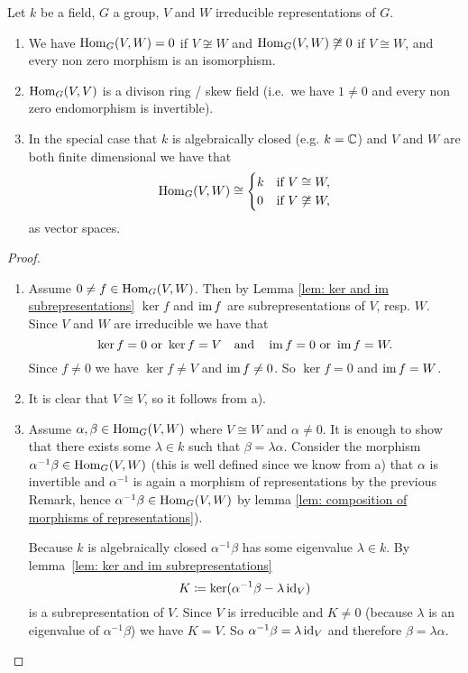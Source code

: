 \begin{lem}
 Let $k$ be a field, $G$ a group, $V$ and $W$ irreducible representations of $G$.
 \begin{enumerate}[label=\emph{\alph*})]
  \item
  We have $\operatorname{Hom}_G(V,W) = 0$ if $V \not\cong W$ and $\operatorname{Hom}_G(V,W) \not\cong 0$ if $V \cong W$, and every non zero morphism is an isomorphism.
  \item
  $\operatorname{Hom}_G(V,V)$ is a divison ring / skew field (i.e.\ we have $1 \neq 0$ and every non zero endomorphism is invertible).
  \item
  In the special case that $k$ is algebraically closed (e.g. $k = \mathbb{C}$) and $V$ and $W$ are both finite dimensional we have that
  \[
   \operatorname{Hom}_G(V,W) \cong
   \begin{cases}
    k & \text{if } V \cong W, \\
    0 & \text{if } V \not\cong W,
   \end{cases}
  \]
  as vector spaces.
 \end{enumerate}
\end{lem}
\begin{proof}
 \begin{enumerate}[label=\emph{\alph*})]
  \item 
  Assume $0 \neq f \in \operatorname{Hom}_G(V,W)$. Then by Lemma \ref{lem: ker and im subrepresentations} $\ker f$ and $\operatorname{im} f$ are subrepresentations of $V$, resp. $W$. Since $V$ and $W$ are irreducible we have that
  \[
   \ker f = 0 \text{ or } \ker f = V \quad \text{and} \quad \operatorname{im} f = 0 \text{ or } \operatorname{im} f = W.
  \]
  Since $f \neq 0$ we have $\ker f \neq V$ and $\operatorname{im} f \neq 0$. So $\ker f = 0$ and $\operatorname{im} f = W$.
  \item
  It is clear that $V \cong V$, so it follows from a).
  \item
  Assume $\alpha, \beta \in \operatorname{Hom}_G(V,W)$ where $V \cong W$ and $\alpha \neq 0$. It is enough to show that there exists some $\lambda \in k$ such that $\beta = \lambda \alpha$. Consider the morphism $\alpha^{-1} \beta \in \operatorname{Hom}_G(V,W)$ (this is well defined since we know from a) that $\alpha$ is invertible and $\alpha^{-1}$ is again a morphism of representations by the previous Remark, hence $\alpha^{-1} \beta \in \operatorname{Hom}_G(V,W)$ by lemma \ref{lem: composition of morphisms of representations}).
  
  Because $k$ is algebraically closed $\alpha^{-1} \beta$ has some eigenvalue $\lambda \in k$. By \mbox{lemma \ref{lem: ker and im subrepresentations}}
  \[
   K \coloneqq \ker(\alpha^{-1} \beta - \lambda \operatorname{id}_V)
  \]
  is a subrepresentation of $V$. Since $V$ is irreducible and $K \neq 0$ (because $\lambda$ is an eigenvalue of $\alpha^{-1} \beta$) we have $K = V$. So $\alpha^{-1} \beta = \lambda \operatorname{id}_V$ and therefore $\beta = \lambda \alpha$. \qedhere
 \end{enumerate}
\end{proof}


